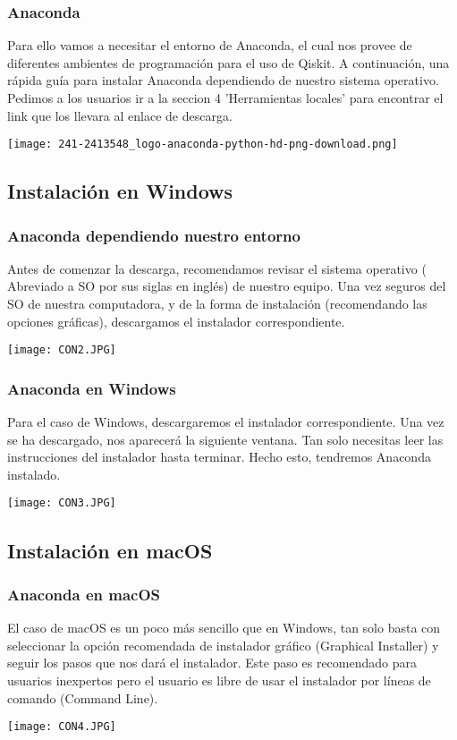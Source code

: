 \documentclass[spanish]{beamer}
\begin{document}
\newpage
\begin{frame}\frametitle{Anaconda}
\setlength{\parskip}{5mm}\justify
Para ello vamos a necesitar el entorno de Anaconda, el cual nos provee de diferentes ambientes de programación para el uso de Qiskit. A continuación, una rápida guía para instalar Anaconda dependiendo de nuestro sistema operativo. Pedimos a los usuarios ir a la seccion 4 'Herramientas locales' para encontrar el link que los llevara al enlace de descarga.

\centering\texttt{[image: 241-2413548\_logo-anaconda-python-hd-png-download.png]}
\end{frame}
\newpage\subsection{Instalación en Windows}
\begin{frame}\frametitle{Anaconda dependiendo nuestro entorno}
\setlength{\parskip}{5mm}\justify
Antes de comenzar la descarga, recomendamos revisar el sistema operativo ( Abreviado a SO por sus siglas en inglés) de nuestro equipo. Una vez seguros del SO de nuestra computadora, y de la forma de instalación (recomendando las opciones gráficas), descargamos el instalador correspondiente.

\centering\texttt{[image: CON2.JPG]}

\end{frame}
\newpage
\begin{frame}\frametitle{Anaconda en Windows}
\setlength{\parskip}{5mm}\justify
Para el caso de Windows, descargaremos el instalador correspondiente. Una vez se ha descargado, nos aparecerá la siguiente ventana. Tan solo necesitas leer las instrucciones del instalador hasta terminar. Hecho esto, tendremos Anaconda instalado.

\centering\texttt{[image: CON3.JPG]}

\end{frame}
\newpage\subsection{Instalación en macOS}
\begin{frame}\frametitle{Anaconda en macOS}
\setlength{\parskip}{5mm}\justify
El caso de macOS es un poco más sencillo que en Windows, tan solo basta con seleccionar la opción recomendada de instalador gráfico (Graphical Installer) y seguir los pasos que nos dará el instalador. Este paso es recomendado para usuarios inexpertos pero el usuario es libre de usar el instalador por líneas de comando (Command Line).

\centering\texttt{[image: CON4.JPG]}

\end{frame}
\end{document}
